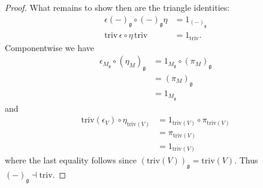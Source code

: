 \begin{proof}
  What remains to show then are the triangle identities:
  \begin{align*}
    \epsilon(-)_\mathfrak{g} \circ (-)_\mathfrak{g}\eta &= 1_{(-)_\mathfrak{g}} \\
    \text{triv}\,\epsilon \circ \eta\,\text{triv} &= 1_{\text{triv}}
  .\end{align*}
  Componentwise we have
  \begin{align*}
    \epsilon_{M_{\mathfrak{g}}} \circ (\eta_M)_\mathfrak{g} &= 1_{M_{\mathfrak{g}}} \circ (\pi_M)_\mathfrak{g} \\
                                                            &= (\pi_M)_\mathfrak{g} \\
                                                            &= 1_{M_\mathfrak{g}}
  \end{align*}
  and
  \begin{align*}
    \text{triv}(\epsilon_V) \circ \eta_{\text{triv}(V)} &= 1_{\text{triv}(V)} \circ \pi_{\text{triv}(V)} \\
                                                        &= \pi_{\text{triv}(V)} \\
                                                        &= 1_{\text{triv}(V)}
  \end{align*}
  where the last equality follows since $ (\text{triv}(V))_\mathfrak{g} = \text{triv}(V) $. Thus $ (-)_\mathfrak{g} \dashv \text{triv} $.



\end{proof}
